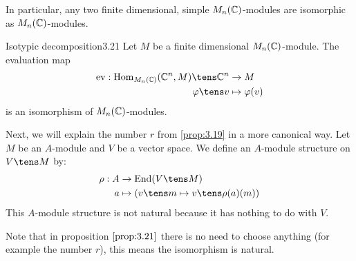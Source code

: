 \documentclass[twoside = false,	%
		headsepline,		%
		parskip = true,
		]{scrbook}						%
\begin{document}
    In particular, any two finite dimensional, simple $M_n(\mathbb C)$-modules are isomorphic as $M_n(\mathbb C)$-modules.
    
    \begin{proposition}{Isotypic decomposition}{3.21}
        Let $M$ be a finite dimensional $M_n(\mathbb C)$-module. The evaluation map
        \begin{equation*}
        \begin{split}
            \ev: \Hom_{M_n(\C)}(\C^n,M) \tens \C^n &\to M \\
            \varphi \tens v &\mapsto \varphi(v)
        \end{split}
        \end{equation*}
        is an isomorphism of $M_n(\mathbb C)$-modules.
    \end{proposition}
    
    Next, we will explain the number $r$ from \ref{prop:3.19} in a more canonical way.
    Let $M$ be an $A$-module and $V$ be a vector space. We define an $A$-module structure on $V \tens M$ by:
    \begin{equation*}
    \begin{split}
        \rho: A &\to \End(V \tens M)\\
            a &\mapsto \round{v \tens m \mapsto v \tens \rho(a)(m)}
    \end{split}
    \end{equation*}
    This $A$-module structure is not natural because it has nothing to do with $V$.

    Note that in proposition $\ref{prop:3.21}$ there is no need to choose anything (for example the number $r$), this means the isomorphism is natural.
\end{document}
